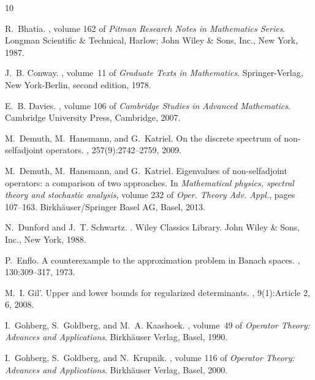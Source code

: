 \documentclass[12pt,a4paper]{article}
\theoremstyle{definition}
\theoremstyle{remark}
\numberwithin{equation}{section}
\begin{document}
\begin{thebibliography}{10}

R.~Bhatia.
, volume 162 of {\em
  Pitman Research Notes in Mathematics Series}.
\newblock Longman Scientific \& Technical, Harlow; John Wiley \& Sons, Inc.,
  New York, 1987.

J.~B. Conway.
, volume~11 of {\em Graduate
  Texts in Mathematics}.
\newblock Springer-Verlag, New York-Berlin, second edition, 1978.

E.~B. Davies.
, volume 106 of {\em
  Cambridge Studies in Advanced Mathematics}.
\newblock Cambridge University Press, Cambridge, 2007.

M.~Demuth, M.~Hansmann, and G.~Katriel.
\newblock On the discrete spectrum of non-selfadjoint operators.
, 257(9):2742--2759, 2009.

M.~Demuth, M.~Hansmann, and G.~Katriel.
\newblock Eigenvalues of non-selfadjoint operators: a comparison of two
  approaches.
\newblock In {\em Mathematical physics, spectral theory and stochastic
  analysis}, volume 232 of {\em Oper. Theory Adv. Appl.}, pages 107--163.
  Birkh\"auser/Springer Basel AG, Basel, 2013.

N.~Dunford and J.~T. Schwartz.
.
\newblock Wiley Classics Library. John Wiley \& Sons, Inc., New York, 1988.

P.~Enflo.
\newblock A counterexample to the approximation problem in {B}anach spaces.
, 130:309--317, 1973.

M.~I. Gil'.
\newblock Upper and lower bounds for regularized determinants.
, 9(1):Article 2, 6, 2008.

I.~Gohberg, S.~Goldberg, and M.~A. Kaashoek.
, volume~49 of {\em
  Operator Theory: Advances and Applications}.
\newblock Birkh\"auser Verlag, Basel, 1990.

I.~Gohberg, S.~Goldberg, and N.~Krupnik.
, volume 116 of {\em
  Operator Theory: Advances and Applications}.
\newblock Birkh\"auser Verlag, Basel, 2000.


\end{thebibliography}
\end{document}
